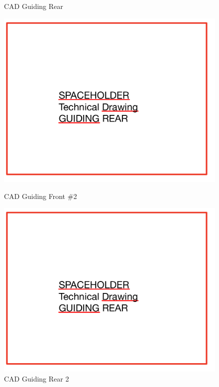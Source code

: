 \begin{figure}[!ht]
\begin{minipage}[b]{0.45\linewidth}
    \caption{CAD Guiding Rear}
    \label{fig:guiding_rear}
  \end{minipage}
\end{figure}

\begin{figure}[!ht]
  \centering
  \begin{minipage}[b]{0.45\linewidth}
    \includegraphics[width=\linewidth]{texfiles/mech/eimg/guiding/guiding_tech_rear.jpg}
    \caption{CAD Guiding Front \#2}
    \label{fig:guiding_front_2}
  \end{minipage}
  \hspace{0.5cm}
  \begin{minipage}[b]{0.45\linewidth}
    \includegraphics[width=\linewidth]{texfiles/mech/eimg/guiding/guiding_tech_rear.jpg}
    \caption{CAD Guiding Rear 2}
    \label{fig:guiding_rear_2}
  \end{minipage}
\end{figure}


